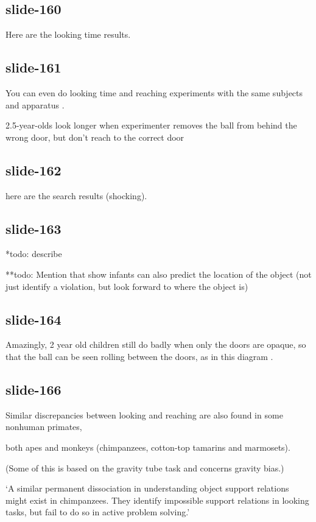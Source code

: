 \documentclass[12pt,\papersize]{extarticle}
\begin{document}
\subsection{slide-160}
Here are the looking time results.
 
\subsection{slide-161}
You can even do looking time and reaching experiments with the same subjects and apparatus \citep{Hood:2003yg}.
 
2.5-year-olds look longer when experimenter removes the ball from behind the wrong door, but don't reach to the correct door
 
\subsection{slide-162}
here are the search results (shocking).
 
\subsection{slide-163}
*todo: describe
 
**todo: Mention that \citep{mash:2006_what} show infants can also predict the location of the object (not just identify a violation, but look forward to where the object is)
 
\subsection{slide-164}
Amazingly, 2 year old children still do badly when only the doors are opaque, so that the
ball can be seen rolling between the doors, as in this diagram \citep{Butler:2002bv}.
 
\subsection{slide-166}
Similar discrepancies between looking and reaching are also found in some nonhuman primates,
 
both apes and monkeys (chimpanzees, cotton-top tamarins and marmosets).
 
(Some of this is based on the gravity tube task and concerns gravity bias.)
 
‘A similar permanent dissociation in understanding object support relations  
might exist in chimpanzees. They identify impossible support relations in looking tasks, 
but fail to do so in active problem solving.’
\citep{gomez:2005_species}
 
\end{document}
